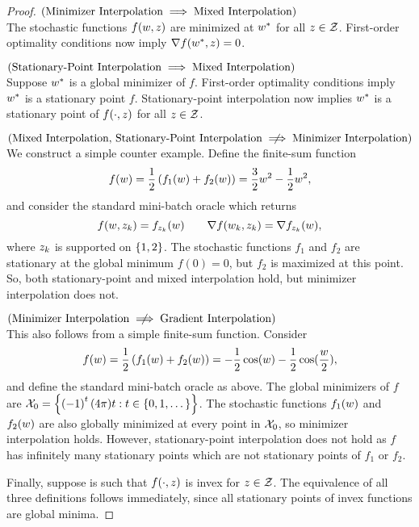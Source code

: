 \interpRelationships*
\begin{proof}
    \( \left(\text{Minimizer Interpolation} \implies \text{Mixed Interpolation}\right) \)\\
    The stochastic functions \( f(w, z) \) are minimized at \( w^* \) for all \( z \in \mathcal{Z} \).
    First-order optimality conditions now imply \( \nabla f(w^*, z) = 0 \).\hfill \break

    \( \left(\text{Stationary-Point Interpolation} \implies \text{Mixed Interpolation}\right) \)\\
    Suppose \( w^* \) is a global minimizer of \( f \). 
    First-order optimality conditions imply \( w^* \) is a stationary point \( f \).
    Stationary-point interpolation now implies \( w^* \) is a stationary point of \( f(\cdot, z) \) for all \( z \in \mathcal{Z} \).\hfill \break

    \( \rbr{ \text{Mixed Interpolation, Stationary-Point Interpolation} \centernot \implies \text{Minimizer Interpolation}} \)\\
    We construct a simple counter example.
    Define the finite-sum function
    \[ f(w) = \frac 1 2 \left(f_1(w) + f_2(w)\right) = \frac{3}{2}w^2 - \frac 1 2w^2, \]
    and consider the standard mini-batch oracle \oracle{} which returns
    \[ f(w, z_{k}) = f_{z_{k}}(w) \quad \quad \nabla f(w_k, z_{k}) = \nabla f_{z_{k}}(w), \] 
    where \( z_{k} \) is supported on \( \left\{1,2\right\} \).
    The stochastic functions \( f_1 \) and \( f_2 \) are stationary at the global minimum \( f(0) = 0 \), but \( f_2 \) is maximized at this point.
    So, both stationary-point and mixed interpolation hold, but minimizer interpolation does not.\hfill \break

    \( \rbr{\text{Minimizer Interpolation} \centernot \implies \text{Gradient Interpolation}} \)\\
    This also follows from a simple finite-sum function.
    Consider
    \[ f(w) = \frac 1 2 \left(f_1(w) + f_2(w)\right) = -\frac 1 2 \cos(w) - \frac 1 2 \cos(\frac{w}{2}), \]
    and define the standard mini-batch oracle \oracle{} as above.
    The global minimizers of \( f \) are \(\mathcal{X}_0 = \left\{\left(-1\right)^{t} (4\pi) t : t \in \left\{0,1, \dots \right\}\right\} \).
    The stochastic functions \( f_1(w) \) and \( f_2(w) \) are also globally minimized at every point in \( \mathcal{X}_0 \), so minimizer interpolation holds.
    However, stationary-point interpolation does not hold as \( f \) has infinitely many stationary points which are not stationary points of \( f_1 \) or \( f_2 \). \hfill \break

    Finally, suppose \oracle{} is such that \( f(\cdot, z) \) is invex for \( z \in \mathcal{Z} \).
    The equivalence of all three definitions follows immediately, since all stationary points of invex functions are global minima.
\end{proof}

